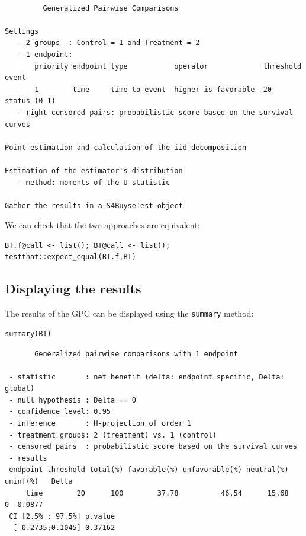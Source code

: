 \documentclass[12pt]{article}
\begin{document}
\begin{verbatim}

         Generalized Pairwise Comparisons

Settings 
   - 2 groups  : Control = 1 and Treatment = 2
   - 1 endpoint: 
       priority endpoint type           operator             threshold event       
       1        time     time to event  higher is favorable  20        status (0 1)
   - right-censored pairs: probabilistic score based on the survival curves 

Point estimation and calculation of the iid decomposition

Estimation of the estimator's distribution 
   - method: moments of the U-statistic

Gather the results in a S4BuyseTest object
\end{verbatim}

We can check that the two approaches are equivalent:
\lstset{language=r,label= ,caption= ,captionpos=b,numbers=none}
\begin{lstlisting}
BT.f@call <- list(); BT@call <- list();
testthat::expect_equal(BT.f,BT)
\end{lstlisting}

\subsection{Displaying the results}
\label{sec:org94e2304}

The results of the GPC can be displayed using the \texttt{summary} method:
\lstset{language=r,label= ,caption= ,captionpos=b,numbers=none}
\begin{lstlisting}
summary(BT)
\end{lstlisting}

\begin{verbatim}
       Generalized pairwise comparisons with 1 endpoint

 - statistic       : net benefit (delta: endpoint specific, Delta: global) 
 - null hypothesis : Delta == 0 
 - confidence level: 0.95 
 - inference       : H-projection of order 1
 - treatment groups: 2 (treatment) vs. 1 (control) 
 - censored pairs  : probabilistic score based on the survival curves
 - results
 endpoint threshold total(%) favorable(%) unfavorable(%) neutral(%) uninf(%)   Delta
     time        20      100        37.78          46.54      15.68        0 -0.0877
 CI [2.5% ; 97.5%] p.value 
  [-0.2735;0.1045] 0.37162
\end{verbatim}
\end{document}
